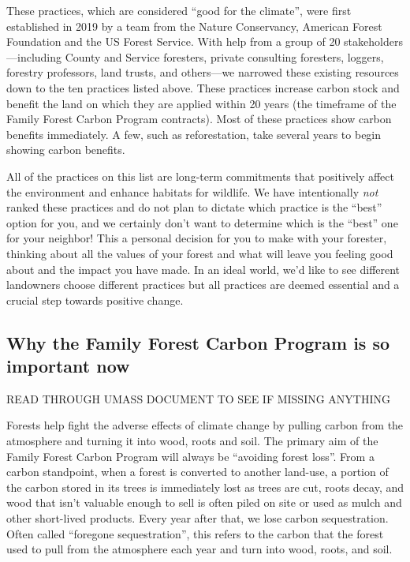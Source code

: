 \documentclass{article}\usepackage[]{graphicx}\usepackage[]{color}
\begin{document}
These practices, which are considered ``good for the climate'', were first established in 2019 by a team from the Nature Conservancy, American Forest Foundation and the US Forest Service. With help from a group of 20 stakeholders---including County and Service foresters, private consulting foresters, loggers, forestry professors, land trusts, and others---we narrowed these existing resources down to the ten practices listed above. These practices increase carbon stock and benefit the land on which they are applied within 20 years (the timeframe of the Family Forest Carbon Program contracts). Most of these practices show carbon benefits immediately. A few, such as reforestation, take several years to begin showing carbon benefits.

All of the practices on this list are long-term commitments that positively affect the environment and enhance habitats for wildlife. We have intentionally \textit{not} ranked these practices and do not plan to dictate which practice is the ``best'' option for you, and we certainly don't want to determine which is the ``best'' one for your neighbor! %
This a personal decision for you to make with your forester, thinking about all the values of your forest and what will leave you feeling good about and the impact you have made. In an ideal world, we'd like to see different landowners choose different practices but all practices are deemed essential and a crucial step towards positive change.

\subsection*{Why the Family Forest Carbon Program is so important now} 
READ THROUGH UMASS DOCUMENT TO SEE IF MISSING ANYTHING

Forests help fight the adverse effects of climate change by pulling carbon from the atmosphere and turning it into wood, roots and soil. The primary aim of the Family Forest Carbon Program will always be ``avoiding forest loss''. From a carbon standpoint, when a forest is converted to another land-use, a portion of the carbon stored in its trees is immediately lost as trees are cut, roots decay, and wood that isn't valuable enough to sell is often piled on site or used as mulch and other short-lived products. Every year after that, we lose carbon sequestration. Often called ``foregone sequestration'', this refers to the carbon that the forest used to pull from the atmosphere each year and turn into wood, roots, and soil.
\end{document}
